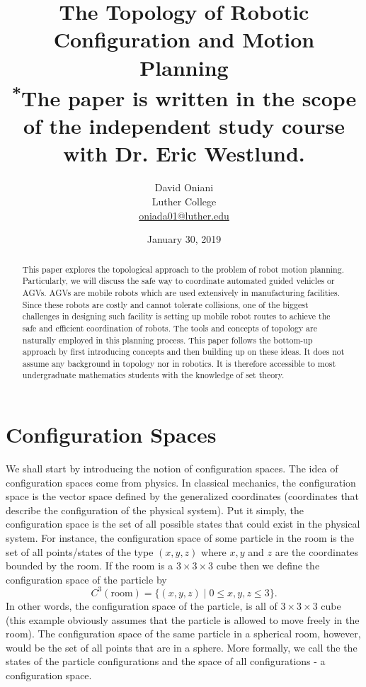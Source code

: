 \documentclass{article}
\title{The Topology of Robotic Configuration and Motion Planning\\
{\small \textsuperscript{*}The paper is written in the scope of the independent study course with Dr. Eric Westlund.}}
\author{David Oniani\\Luther College\\\href{mailto:oniada01@luther.edu}{oniada01@luther.edu}}
\date{January 30, 2019}
\theoremstyle{definition}
\begin{document}
\maketitle


\begin{abstract}
\noindent This paper explores the topological approach to the problem
of robot motion planning. Particularly, we will discuss
the safe way to coordinate automated guided vehicles or AGVs.
AGVs are mobile robots which are used extensively in manufacturing
facilities. Since these robots are costly and cannot tolerate collisions,
one of the biggest challenges in designing such facility is setting up
mobile robot routes to achieve the safe and efficient coordination of robots.
The tools and concepts of topology are naturally employed in this planning
process. This paper follows the bottom-up approach by first introducing
concepts and then building up on these ideas. It does not assume any background
in topology nor in robotics. It is therefore accessible to most undergraduate
mathematics students with the knowledge of set theory.
\end{abstract}


\section*{\centering Configuration Spaces}
We shall start by introducing the notion of configuration spaces.
The idea of configuration spaces come from physics. In classical mechanics,
the configuration space is the vector space defined by the generalized
coordinates (coordinates that describe the configuration of the physical system).
Put it simply, the configuration space is the set of all possible states that
could exist in the physical system. For instance, the configuration space of some
particle in the room is the set of all points/states of the type $(x, y, z)$ where
$x, y$ and $z$ are the coordinates bounded by the room. If the room is a $3 \times 3 \times 3$
cube then we define the configuration space of the particle by
$$C^3(\text{room}) = \{(x, y, z) \mid 0 \leq x, y, z \leq 3\}.$$
In other words, the configuration space of the particle, is all of $3 \times 3 \times 3$ cube
(this example obviously assumes that the particle is allowed to move freely in the room).
The configuration space of the same particle in a spherical room, however, would be the set of all
points that are in a sphere. More formally, we call the the states of the particle configurations
and the space of all configurations - a configuration space.
\end{document}
